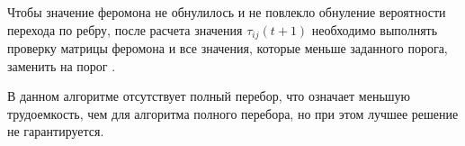 Чтобы значение феромона не обнулилось и не повлекло обнуление вероятности перехода по ребру, после расчета значения $\tau_{ij}(t+1)$ необходимо выполнять проверку матрицы феромона и все значения, которые меньше заданного порога, заменить на порог \cite{ants}.

В данном алгоритме отсутствует полный перебор, что означает меньшую трудоемкость, чем для алгоритма полного перебора, но при этом лучшее решение не гарантируется.
 





